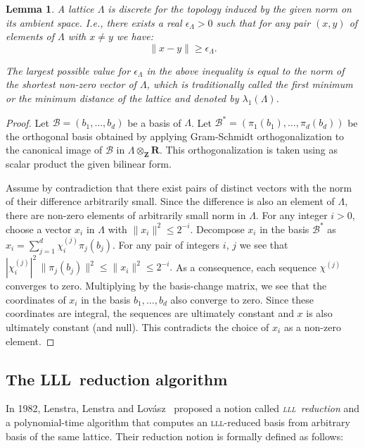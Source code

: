 \documentclass{amsart}
\newcommand{\LLL}{\mbox{\textsc{lll}}}
\newcommand{\ZZ}{\mathbf{Z}}
\newcommand{\RR}{\mathbf{R}}
\newcommand{\Lat}{\Lambda}
\newcommand{\Bas}{\mathcal{B}}
\newtheorem{lemma}[theorem]{Lemma}
\theoremstyle{definition}
\begin{document}
\begin{lemma}
A lattice $\Lat$ is discrete for the topology induced by the given
norm on its ambient space. I.e., there exists a real $\epsilon_\Lat>0$ such
that for any pair $(x,y)$ of elements of $\Lat$ with $x\neq y$ we
have:
$$
\| x-y \| \geq \epsilon_\Lat.
$$

The largest possible value for $\epsilon_\Lat$ in the above inequality
is equal to the norm of the shortest non-zero vector of $\Lat$, which
is traditionally called the \emph{first minimum} or the \emph{minimum
  distance} of the lattice and denoted by $\lambda_1 (\Lat)$.
\end{lemma}
\begin{proof}
  Let $\Bas = (b_1, \ldots, b_d)$ be a basis of $\Lat$. Let
  $\Bas^* = (\pi_1(b_1), \ldots, \pi_d(b_d))$ be the orthogonal basis obtained by
  applying Gram-Schmidt orthogonalization to the canonical image of
  $\Bas$ in $\Lat\otimes_\ZZ \RR$. This orthogonalization is taken using
  as scalar product the given bilinear form.

Assume by contradiction that there exist pairs of distinct vectors
with the norm of their difference arbitrarily small.  Since the
difference is also an element of $\Lat$, there are non-zero elements
of arbitrarily small norm in $\Lat$.
For any integer $i>0$, choose a
vector $x_i$ in $\Lat$ with $\|x_i\|^2\leq 2^{-i}.$ Decompose
$x_i$ in the basis $\Bas^*$ as
$
x_i=\sum_{j=1}^{d}\chi_i^{(j)}\pi_j(b_j).
$
For any pair of integers $i$, $j$ we see that
$
|\chi_i^{(j)}|^2\,\|\pi_j(b_j)\|^2\leq \|x_i\|^2\leq 2^{-i}.
$
As a consequence, each sequence $\chi^{(j)}$ converges to
zero. Multiplying by the basis-change matrix, we see that the coordinates
of $x_i$ in the basis $b_1, \ldots, b_d$ also converge to zero. Since these
coordinates are integral, the sequences are ultimately constant and
$x$ is also ultimately constant (and null). This contradicts the choice of
$x_i$ as a non-zero element.
\end{proof}
\medskip



\subsection{The LLL~reduction algorithm}
In 1982, Lenstra, Lenstra and Lovász~\cite{LLL82} proposed a
notion called \emph{\LLL~reduction} and a polynomial-time
algorithm that computes an {\LLL}-reduced basis from arbitrary basis
of the same lattice. Their reduction notion is formally defined as follows:
\end{document}
